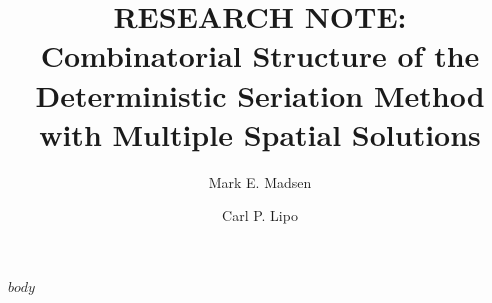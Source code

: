 \documentclass[preprint,times,authoryear,12pt]{elsarticle}
\begin{document}
\begin{frontmatter}


\title{RESEARCH NOTE:\\ Combinatorial Structure of the Deterministic Seriation Method with Multiple Spatial Solutions}

\author{Mark E. Madsen}
\address{Department of Anthropology, Box 353100, University of Washington, Seattle WA, 98195 USA}

\author{Carl P. Lipo}
\address{Department of Anthropology and IIRMES, 1250 Bellflower Blvd, California State University at Long Beach, Long Beach CA, 90840 USA}

\end{frontmatter}

$body$





\end{document}
